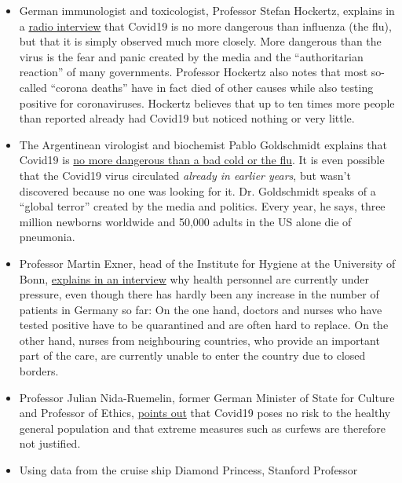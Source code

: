 \begin{itemize}
\tightlist
\item
  German immunologist and toxicologist, Professor Stefan Hockertz,
  explains in a \href{https://www.youtube.com/watch?v=7wfb-B0BWmo}{radio
  interview} that Covid19 is no more dangerous than influenza (the flu),
  but that it is simply observed much more closely. More dangerous than
  the virus is the fear and panic created by the media and the
  ``authoritarian reaction'' of many governments. Professor Hockertz
  also notes that most so-called ``corona deaths'' have in fact died of
  other causes while also testing positive for coronaviruses. Hockertz
  believes that up to ten times more people than reported already had
  Covid19 but noticed nothing or very little.
\item
  The Argentinean virologist and biochemist Pablo Goldschmidt explains
  that Covid19 is
  \href{https://www.clarin.com/buena-vida/coronavirus-panico-injustificado-dice-virologo-argentino-francia_0_yVcmJ4RM.html}{no
  more dangerous than a bad cold or the flu}. It is even possible that
  the Covid19 virus circulated \emph{already in earlier years}, but
  wasn't discovered because no one was looking for it. Dr. Goldschmidt
  speaks of a ``global terror'' created by the media and politics. Every
  year, he says, three million newborns worldwide and 50,000 adults in
  the US alone die of pneumonia.
\item
  Professor Martin Exner, head of the Institute for Hygiene at the
  University of Bonn,
  \href{https://www.youtube.com/watch?v=9mI9trSm3PY}{explains in an
  interview} why health personnel are currently under pressure, even
  though there has hardly been any increase in the number of patients in
  Germany so far: On the one hand, doctors and nurses who have tested
  positive have to be quarantined and are often hard to replace. On the
  other hand, nurses from neighbouring countries, who provide an
  important part of the care, are currently unable to enter the country
  due to closed borders.
\item
  Professor Julian Nida-Ruemelin, former German Minister of State for
  Culture and Professor of Ethics,
  \href{https://www.zdf.de/nachrichten/zdf-morgenmagazin/julian-nida-ruemelin-zur-corona-krise-100.html}{points
  out} that Covid19 poses no risk to the healthy general population and
  that extreme measures such as curfews are therefore not justified.
\item
  Using data from the cruise ship Diamond Princess, Stanford Professor

\end{itemize}
